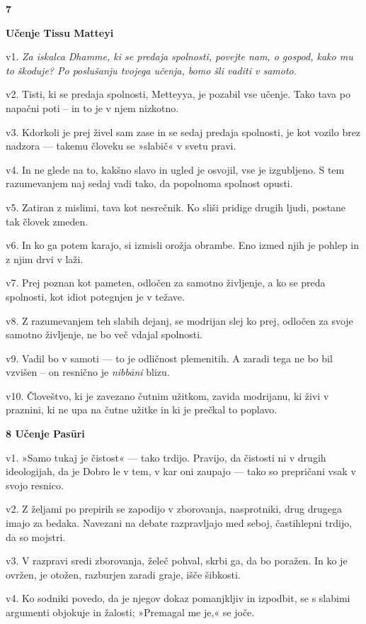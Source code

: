 \textbf{7 }

\textbf{Učenje Tissu Matteyi }

v1. \emph{Za iskalca Dhamme, ki se predaja spolnosti, povejte nam, o gospod, kako mu to škoduje? Po poslušanju tvojega učenja, bomo šli vaditi v samoto.}

v2. Tisti, ki se predaja spolnosti, Metteyya, je pozabil vse učenje. Tako tava po napačni poti -- in to je v njem nizkotno.

v3. Kdorkoli je prej živel sam zase in se sedaj predaja spolnosti, je kot vozilo brez nadzora --- takemu človeku se »slabič« v svetu pravi.

v4. In ne glede na to, kakšno slavo in ugled je osvojil, vse je izgubljeno. S tem razumevanjem naj sedaj vadi tako, da popolnoma spolnost opusti.

v5. Zatiran z mislimi, tava kot nesrečnik. Ko sliši pridige drugih ljudi, postane tak človek zmeden.

v6. In ko ga potem karajo, si izmisli orožja obrambe. Eno izmed njih je pohlep in z njim drvi v laži.

v7. Prej poznan kot pameten, odločen za samotno življenje, a ko se preda spolnosti, kot idiot potegnjen je v težave.

v8. Z razumevanjem teh slabih dejanj, se modrijan slej ko prej, odločen za svoje samotno življenje, ne bo več vdajal spolnosti.

v9. Vadil bo v samoti --- to je odličnost plemenitih. A zaradi tega ne bo bil vzvišen -- on resnično je \emph{nibbāni} blizu.

v10. Človeštvo, ki je zavezano čutnim užitkom, zavida modrijanu, ki živi v praznini, ki ne upa na čutne užitke in ki je prečkal to poplavo.

\textbf{8 Učenje Pasūri}

v1. »Samo tukaj je čistost« --- tako trdijo. Pravijo, da čistosti ni v drugih ideologijah, da je Dobro le v tem, v kar oni zaupajo --- tako so prepričani vsak v svojo resnico.

v2. Z željami po prepirih se zapodijo v zborovanja, nasprotniki, drug drugega imajo za bedaka. Navezani na debate razpravljajo med seboj, častihlepni trdijo, da so mojstri.

v3. V razpravi sredi zborovanja, želeč pohval, skrbi ga, da bo poražen. In ko je ovržen, je otožen, razburjen zaradi graje, išče šibkosti.

v4. Ko sodniki povedo, da je njegov dokaz pomanjkljiv in izpodbit, se s slabimi argumenti objokuje in žalosti; »Premagal me je,« se joče.

